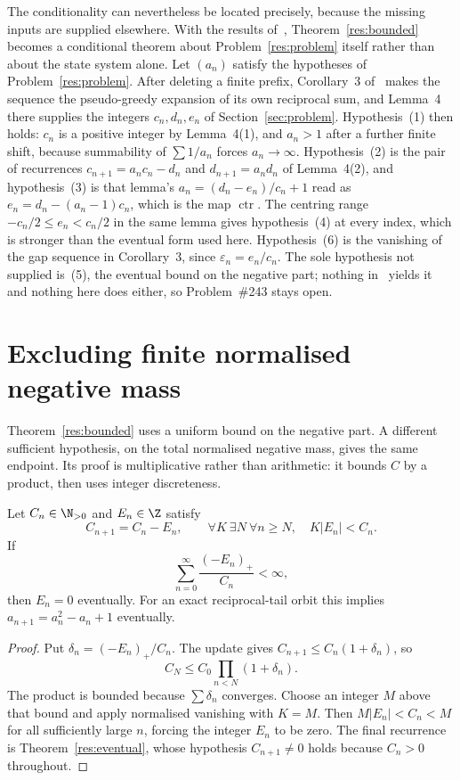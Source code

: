 \documentclass[11pt]{article}
\newcommand{\ctr}{\operatorname{ctr}}
\begin{document}
The conditionality can nevertheless be located precisely, because the missing
inputs are supplied elsewhere.  With the results of~\cite{koizumi2025},
Theorem~\ref{res:bounded} becomes a conditional theorem about
Problem~\ref{res:problem} itself rather than about the state system alone.  Let
$(a_n)$ satisfy the hypotheses of Problem~\ref{res:problem}.  After deleting a
finite prefix, Corollary~3 of~\cite[p.~9]{koizumi2025} makes the sequence the
pseudo-greedy expansion of its own reciprocal sum, and Lemma~4 there supplies
the integers $c_n,d_n,e_n$ of Section~\ref{sec:problem}.  Hypothesis~(1) then
holds: $c_n$ is a positive integer by Lemma~4(1), and $a_n>1$ after a further
finite shift, because summability of $\sum1/a_n$ forces $a_n\to\infty$.
Hypothesis~(2) is the pair of recurrences $c_{n+1}=a_nc_n-d_n$ and
$d_{n+1}=a_nd_n$ of Lemma~4(2), and hypothesis~(3) is that lemma's
$a_n=(d_n-e_n)/c_n+1$ read as $e_n=d_n-(a_n-1)c_n$, which is the map $\ctr$.
The centring range $-c_n/2\le e_n<c_n/2$ in the same lemma gives
hypothesis~(4) at every index, which is stronger than the eventual form used
here.  Hypothesis~(6) is the vanishing
of the gap sequence in Corollary~3, since $\varepsilon_n=e_n/c_n$.  The sole
hypothesis not supplied is~(5), the eventual bound on the negative part;
nothing in~\cite{koizumi2025} yields it and nothing here does either, so
Problem~\#243 stays open.

\section{Excluding finite normalised negative mass}\label{sec:mass}

Theorem~\ref{res:bounded} uses a uniform bound on the negative part.  A different sufficient hypothesis, on the total normalised negative mass,
gives the same endpoint.  Its proof is multiplicative rather than arithmetic:
it bounds $C$ by a product, then uses integer discreteness.

\begin{theorem}\label{res:mass}
Let \(C_n\in\N_{>0}\) and \(E_n\in\Z\) satisfy
\[
 C_{n+1}=C_n-E_n,\qquad
 \forall K\ \exists N\ \forall n\ge N,\quad K|E_n|<C_n .
\]
If
\[
 \sum_{n=0}^{\infty}\frac{(-E_n)_+}{C_n}<\infty ,
\]
then \(E_n=0\) eventually.  For an exact reciprocal-tail orbit this implies
\(a_{n+1}=a_n^2-a_n+1\) eventually.
\end{theorem}

\begin{proof}
Put \(\delta_n=(-E_n)_+/C_n\).  The update gives
\(C_{n+1}\le C_n(1+\delta_n)\), so
\[
 C_N\le C_0\prod_{n<N}(1+\delta_n).
\]
The product is bounded because \(\sum\delta_n\) converges.  Choose an integer
\(M\) above that bound and apply normalised vanishing with \(K=M\).  Then
\(M|E_n|<C_n<M\) for all sufficiently large \(n\), forcing the integer
\(E_n\) to be zero.  The final recurrence is Theorem~\ref{res:eventual}, whose
hypothesis $C_{n+1}\ne0$ holds because $C_n>0$ throughout.
\end{proof}
\end{document}
